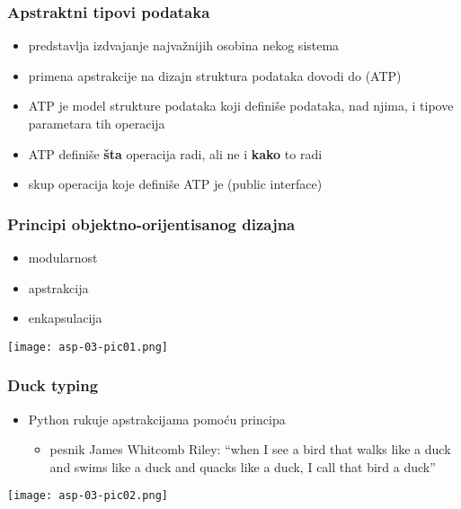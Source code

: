 \documentclass[compress,aspectratio=169]{beamer}
\begin{document}
\begin{frame}[fragile]
  \frametitle{Apstraktni tipovi podataka}
  \begin{itemize}
    \item {} predstavlja izdvajanje najvažnijih osobina nekog sistema
    \item primena apstrakcije na dizajn struktura podataka dovodi do  (ATP)
    \item ATP je model strukture podataka koji definiše  podataka,  nad njima, i tipove parametara tih operacija
    \item ATP definiše \textbf{šta} operacija radi, ali ne i \textbf{kako} to radi
    \item skup operacija koje definiše ATP je  (public interface)
  \end{itemize}
\end{frame}

\begin{frame}[fragile]
  \frametitle{Principi objektno-orijentisanog dizajna}
  \begin{itemize}
    \item modularnost
    \item apstrakcija
    \item enkapsulacija
  \end{itemize}
  \begin{center}
    \texttt{[image: asp-03-pic01.png]}
  \end{center}
\end{frame}

\begin{frame}[fragile]
  \frametitle{Duck typing}
  \begin{itemize}
    \item Python rukuje apstrakcijama pomoću  principa
    \begin{itemize}
      \item pesnik James Whitcomb Riley: ``when I see a bird that walks like a duck and swims like a duck and quacks like a duck, I call that bird a duck''
    \end{itemize}
  \end{itemize}
  \begin{center}
    \texttt{[image: asp-03-pic02.png]}
  \end{center}
\end{frame}
\end{document}
